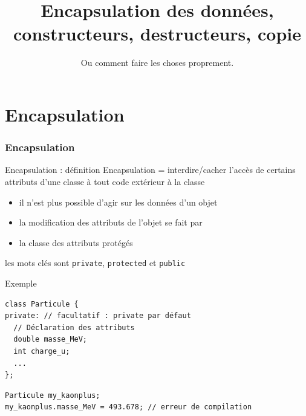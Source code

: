 \documentclass[c]{beamer}
\title{Encapsulation des données, constructeurs, destructeurs, copie}
\subtitle{Ou comment faire les choses proprement.}
\newcommand{\inline}[1]{\texttt{#1}}
\begin{document}
\maketitle



\part{Encapsulation}
\frame{\partpage}


\section{Encapsulation}

\begin{frame}[fragile]{Encapsulation : définition}
Encapsulation = interdire/cacher l'accès de certains attributs d'une classe à tout code extérieur à la classe

\begin{itemize}
\item il n'est plus possible d'agir  sur les données d'un objet

\item la modification des attributs de l'objet se fait par 

\item la classe  des attributs protégés
\end{itemize}

 les mots clés sont \inline{private}, \inline{protected} et \inline{public}
\end{frame}

\begin{frame}[fragile]{Exemple}
\begin{verbatim}
class Particule {
private: // facultatif : private par défaut
  // Déclaration des attributs
  double masse_MeV;
  int charge_u;
  ...
};
\end{verbatim}
\pause
\vspace{1em}
\vspace{1em}
\begin{verbatim}
Particule my_kaonplus;
my_kaonplus.masse_MeV = 493.678; // erreur de compilation
\end{verbatim}
\end{frame}
\end{document}
